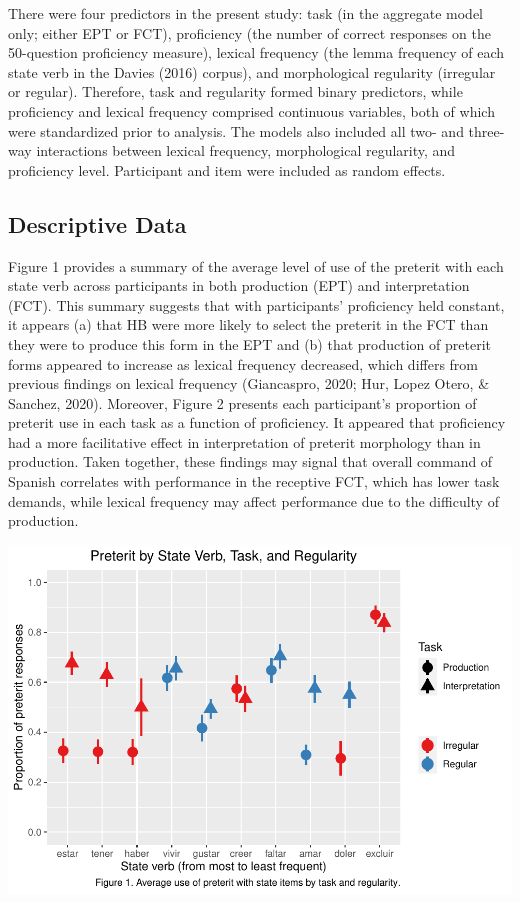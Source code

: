 \documentclass[
  english,
  man,floatsintext]{apa6}
\begin{document}
There were four predictors in the present study: task (in the aggregate model only; either EPT or FCT), proficiency (the number of correct responses on the 50-question proficiency measure), lexical frequency (the lemma frequency of each state verb in the Davies (2016) corpus), and morphological regularity (irregular or regular). Therefore, task and regularity formed binary predictors, while proficiency and lexical frequency comprised continuous variables, both of which were standardized prior to analysis. The models also included all two- and three-way interactions between lexical frequency, morphological regularity, and proficiency level. Participant and item were included as random effects.

\hypertarget{descriptive-data}{%
\subsection{Descriptive Data}\label{descriptive-data}}

Figure 1 provides a summary of the average level of use of the preterit with each state verb across participants in both production (EPT) and interpretation (FCT). This summary suggests that with participants' proficiency held constant, it appears (a) that HB were more likely to select the preterit in the FCT than they were to produce this form in the EPT and (b) that production of preterit forms appeared to increase as lexical frequency decreased, which differs from previous findings on lexical frequency (Giancaspro, 2020; Hur, Lopez Otero, \& Sanchez, 2020). Moreover, Figure 2 presents each participant's proportion of preterit use in each task as a function of proficiency. It appeared that proficiency had a more facilitative effect in interpretation of preterit morphology than in production. Taken together, these findings may signal that overall command of Spanish correlates with performance in the receptive FCT, which has lower task demands, while lexical frequency may affect performance due to the difficulty of production.

\includegraphics{Final-Manuscript_files/figure-latex/Pret-LI-graph-1.pdf}
\end{document}
